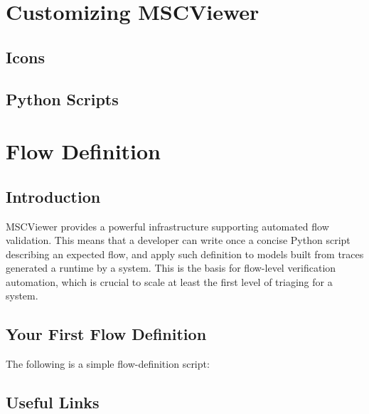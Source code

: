 \documentclass[11pt, twoside, titlepage]{book}
\newcommand{\prog}{MSCViewer}
\begin{document}
\chapter{Customizing \prog}
\section{Icons}
\section{Python Scripts}

\chapter{Flow Definition}
\section{Introduction}
\prog{} provides a powerful infrastructure supporting automated flow validation.
This means that a developer can write once a concise Python script describing an expected flow,
and apply such definition to models built from traces generated a runtime by a system. This
is the basis for flow-level verification automation, which is crucial to scale at least the first
level of triaging for a system.

\section{Your First Flow Definition}
The following is a simple flow-definition script:


\appendix
\section{Useful Links}
\begin{tabular}{l l p{9.0cm}}

\end{tabular}
 
\printindex
\end{document}
